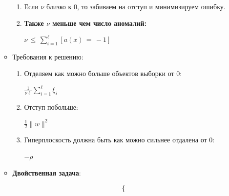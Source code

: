 \begin{itemize}
\begin{itemize}
\begin{enumerate}
                            \item Если $\nu$ близко к $0$, то забиваем на отступ и минимизируем ошибку.

                            \item \textbf{Также $\nu$ меньше чем число аномалий:}
                            \begin{center}
                                \large
                                $\nu \, \leq \, \sum\limits_{i = 1}^\ell [a(x)\, = \,-1]$
                            \end{center}
                        \end{enumerate}


                    \item \colorbox{purple!20}{Требования к решению}:
                        \begin{enumerate}
                            \item Отделяем как можно больше объектов выборки от $0$:
                            \begin{center}
                            \Large
                                $\frac{1}{\nu\ell} \sum\limits_{i = 1}^\ell \xi_i$
                            \end{center}

                            \item Отступ побольше:
                                \begin{center}
                                    \Large
                                    $\frac{1}{2} \| w \|^2$
                                \end{center}

                            \item Гиперплоскость должна быть как можно сильнее отдалена от $0$:
                            \begin{center}
                                \Large
                                $- \rho$
                            \end{center}
                        \end{enumerate}

                        \item \colorbox{purple!20}{\textbf{Двойственная задача}}:

                            \begin{equation*}
                            \Large
                                \begin{cases}
                                    

\end{cases}
\end{equation*}
\end{itemize}
\end{itemize}
